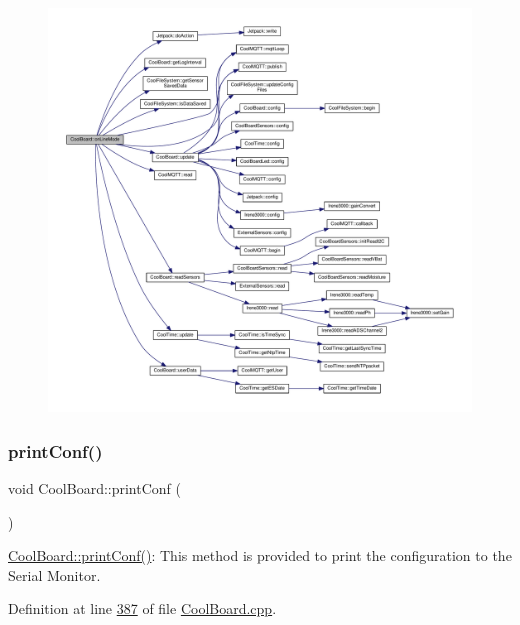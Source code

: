 \begin{figure}[H]
\begin{center}
\leavevmode
\includegraphics[width=350pt]{class_cool_board_aa0bbc4bc605e35618d18e68795c61363_cgraph}
\end{center}
\end{figure}
\mbox{\label{class_cool_board_a486507b8f0981d3cc671ed31c2145755}} 
\subsubsection{\texorpdfstring{print\+Conf()}{printConf()}}
{\footnotesize\ttfamily void Cool\+Board\+::print\+Conf (\begin{DoxyParamCaption}{ }\end{DoxyParamCaption})}

\hyperlink{class_cool_board_a486507b8f0981d3cc671ed31c2145755}{Cool\+Board\+::print\+Conf()}\+: This method is provided to print the configuration to the Serial Monitor. 

Definition at line \hyperlink{_cool_board_8cpp_source_l00387}{387} of file \hyperlink{_cool_board_8cpp_source}{Cool\+Board.\+cpp}.


